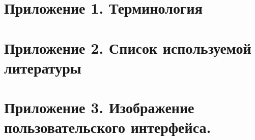 \documentclass[
encoding=utf8
]{eskd}
\begin{document}
\newpage
\section{Приложение 1. Терминология}


\newpage
\section{Приложение 2. Список используемой литературы}


\newpage
\section{Приложение 3. Изображение пользовательского интерфейса.}

\newpage
{}
{}    
\printindex
\end{document}
